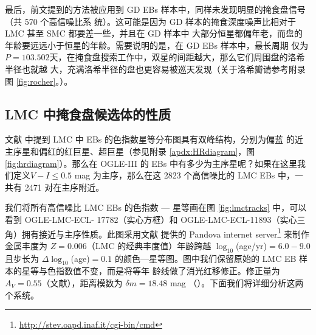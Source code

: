 最后，前文提到的方法被应用到 GD EBs 样本中，同样未发现明显的掩食盘信号（共 570 个高信噪比系
统）。这可能是因为 GD 样本的掩食深度噪声比相对于 LMC 甚至 SMC 都要差一些，并且在 GD 样本中
大部分恒星都偏年老，而盘的年龄要远远小于恒星的年龄。需要说明的是，在 GD EBs 样本中，最长周期
仅为 $P = 103.502 $天，在掩食盘搜索工作中，双星的间距越大，那么它们周围盘的洛希半径也就越
大，充满洛希半径的盘也更容易被巡天发现（关于洛希瓣请参考附录图 \ref{fig:rocher}。）。

\subsection{LMC 中掩食盘候选体的性质} \label{sec:discebprop}

文献  中提到 LMC 中 EBs 的色指数星等分布图具有双峰结构，分别为偏蓝
的近主序星和偏红的红巨星、超巨星（参见附录 \ref{apdx:HRdiagram}，图 \ref{fig:hrdiagram}）。那么在 
OGLE-III 的 EBs 中有多少为主序星呢？如果在这里我们定义$V - I \le 0.5 $ mag 为主序，那么在这 2823 
个高信噪比的 LMC EBs 中，一共有 2471 对在主序附近。


我们将所有高信噪比 LMC EBs 的色指数 --- 星等画在图 \ref{fig:lmctracks} 中，可以看到 OGLE-LMC-ECL- 
17782（实心方框）和 OGLE-LMC-ECL-11893（实心三角）拥有接近与主序性质。此图采用文献 
 提供的 Pandova internet server\footnote{\url{http://stev.oapd.inaf.it/cgi-bin/cmd}} 来制作
金属丰度为 $Z=0.006$（LMC 的经典丰度值）年龄跨越 $\log_{10}$(age/yr)$=6.0-9.0$ 且步长为 $\Delta 
\log_{10}$(age)$=0.1$ 的颜色---星等图。图中我们保留原始的 LMC EB 样本的星等与色指数值不变，而是将等年
龄线做了消光红移修正。修正量为 $A_V=0.55$（文献），距离模数为 $\delta m=18.48$ mag 
（）。下面我们将详细分析这两个系统。


